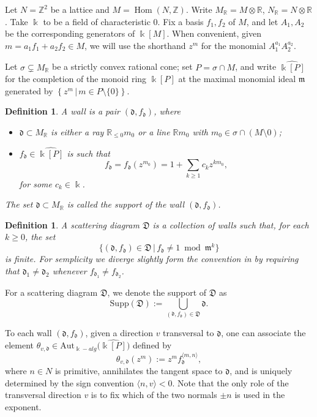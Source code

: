 \documentclass[11pt]{amsart}
\newtheorem{defn}[theorem]{Definition}
\theoremstyle{remark}
\numberwithin{equation}{section}
\newcommand{\ZZ}{\mathbb{Z}}
\newcommand{\RR}{\mathbb{R}}
\newcommand{\Hom}{\operatorname{Hom}}
\newcommand{\dd}{\mathfrak{d}}
\newcommand{\DD}{\mathfrak{D}}
\newcommand{\fom}{\mathfrak{m}}
\begin{document}
Let $N = \ZZ^2$ be a lattice and $M = \Hom (N, \ZZ)$. Write $M_{\RR} = M \otimes
\RR$, $N_{\RR} = N\otimes \RR$. Take $\Bbbk$ to be a field of characteristic 0.
Fix a basis $f_1, f_2$ of $M$, and let $A_1,A_2$ be the corresponding generators
of $\Bbbk[M]$. When convenient, given $m=a_1f_1+a_2f_2\in M$,  we will use the 
shorthand $z^m$ for the monomial $A_1^{a_1} A_2^{a_2}$.

Let $\sigma \subsetneq M_{\RR}$ be a strictly convex rational cone; set
$P=\sigma \cap M$, and write $\widehat{\Bbbk[P]}$ for the completion of the
monoid ring $\Bbbk[P]$ at the maximal monomial ideal $\fom$ generated by
$\left\{z^m \,|\, m\in P\setminus\{0\}\right\}$.

\begin{defn}
  \label{walldef}
  A \emph{wall} is a pair $(\dd, f_{\dd})$, where 
  \begin{itemize}

    \item 
      $\dd \subset M_{\mathbb{R}}$ is either a ray $\RR_{\le 0} m_0$ or a line
      $\RR m_0$ with $m_0\in \sigma \cap(M\setminus 0)$;

    \item 
      $f_{\dd} \in \widehat{\Bbbk [P]}$ is such that 
      \[ 
        f_{\dd} = f_{\dd}(z^{m_0}) = 1 + \sum_{k\geq 1} c_k z^{k m_0},
      \] 
      for some $c_k \in \Bbbk$. 
  \end{itemize}
  The set $\dd \subset M_{\mathbb{R}}$ is called the \emph{support} of the wall
  $(\dd, f_{\dd})$.
\end{defn}

\begin{defn}
  \label{def:scattering_diagram}
  A scattering diagram $\DD$ is a collection of walls such that, for each $k \geq
  0$, the set
  \[
    \{ (\dd, f_{\dd}) \in \DD\, |\, f_{\dd} \neq 1 \bmod \fom^k \}
  \]
  is finite. For semplicity we diverge slightly form the convention in
  \cite{GHKK} by requiring that $\dd_1 \neq \dd_2$ whenever $f_{\dd_1}\neq
  f_{\dd_2}$.
\end{defn}

For a scattering diagram $\DD$, we denote the support of $\DD$ as
\[
  \text{Supp} (\DD) := \bigcup_{(\dd, f_{\dd}) \in \DD} \dd. 
\]

To each wall $(\dd, f_{\dd})$, given a direction $v$ transversal to $\dd$, one
can associate the element $\theta_{v,\dd}\in
{\mathrm{Aut}}_{\Bbbk-alg}\big(\widehat{\Bbbk[P]}\big)$ defined by
\[
  \theta_{v,\dd} (z^m) := z^m f_{\dd}^{\langle m, n \rangle }, 
\]
where $n\in N$ is primitive, annihilates the tangent space to $\dd$, and is
uniquely determined by the sign convention $ \langle n, v \rangle <0$.  Note
that the only role of the transversal direction $v$ is to fix which of the two
normals $\pm n$ is used in the exponent. 
\end{document}
